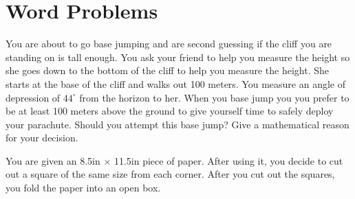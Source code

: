 \documentclass[addpoints]{exam}
\begin{document}
\section*{Word Problems}
    \begin{questions}
    \setcounter{question}{55}
    \question[1] You are about to go base jumping and are second guessing if the cliff you are standing on is tall enough. You ask your friend to help you measure the height so she goes down to the bottom of the cliff to help you measure the height. She starts at the base of the cliff and walks out 100 meters. You measure an angle of depression of $44^\circ$ from the horizon to her. When you base jump you you prefer to be at least 100 meters above the ground to give yourself time to safely deploy your parachute. Should you attempt this base jump? Give a mathematical reason for your decision.

        \vspace{0.5cm}
         
        
    
    \question[1] You are given an 8.5in $\times$ 11.5in piece of paper. After using it, you decide to cut out a square of the same size from each corner. After you cut out the squares, you fold the paper into an open box.
\end{questions}
\end{document}
